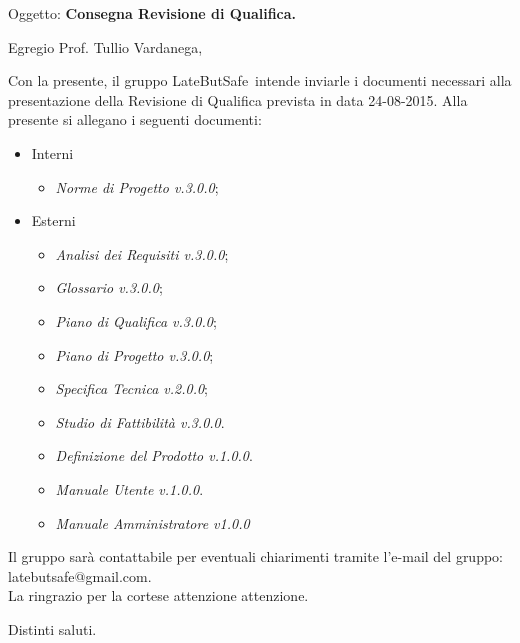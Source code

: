 \documentclass{letter}
\makeatletter
\newcommand{\DefinizioneDelProdotto}{\textit{Definizione del Prodotto v.1.0.0}}
\newcommand{\SpecificaTecnica}{\textit{Specifica Tecnica v.2.0.0}}
\newcommand{\AnalisiDeiRequisiti}{\textit{Analisi dei Requisiti v.3.0.0}}
\newcommand{\PianoDiProgetto}{\textit{Piano di Progetto v.3.0.0}}
\newcommand{\NormeDiProgetto}{\textit{Norme di Progetto v.3.0.0}}
\newcommand{\PianoDiQualifica}{\textit{Piano di Qualifica v.3.0.0}}
\newcommand{\ManualeUtente}{\textit{Manuale Utente v.1.0.0}}
\newcommand{\ManualeAmministratore}{\textit{Manuale Amministratore v1.0.0}}
\newcommand{\Glossario}{\textit{Glossario v.3.0.0}}
\newcommand{\StudioDiFattibilita}{\textit{Studio di Fattibilità v.3.0.0}}
\newcommand{\gruppo}{LateButSafe}
\newcommand{\mail}{latebutsafe@gmail.com}
\newcommand{\Vardanega}{Prof. Tullio Vardanega}
\makeatother
\begin{document}
	
	\begin{letter}{Oggetto: \textbf{Consegna Revisione di Qualifica.}}
	\opening {Egregio \Vardanega ,}
	Con la presente, il gruppo \gruppo\ intende inviarle i documenti necessari alla presentazione della Revisione di Qualifica prevista in data 24-08-2015.
	Alla presente si allegano i seguenti documenti:
			\begin{itemize}
				\item Interni
					\begin{itemize}
						\item \NormeDiProgetto;
					\end{itemize}
				\item Esterni
					\begin{itemize}
						\item \AnalisiDeiRequisiti;
						\item \Glossario;
						\item \PianoDiQualifica;
						\item \PianoDiProgetto;
						\item \SpecificaTecnica;
						\item \StudioDiFattibilita.
						\item \DefinizioneDelProdotto.
						\item \ManualeUtente.
						\item \ManualeAmministratore
					\end{itemize}
			\end{itemize} 
		Il gruppo sarà  contattabile per eventuali chiarimenti tramite l'e-mail del gruppo: \mail.	\\
		La ringrazio per la cortese attenzione attenzione.
		
		\thispagestyle{fancy}
		\closing{Distinti saluti.}
		\signature{Manuel Fossa\\
					Responsabile di Progetto\\
					\gruppo}
   \end{letter}
\end{document}
